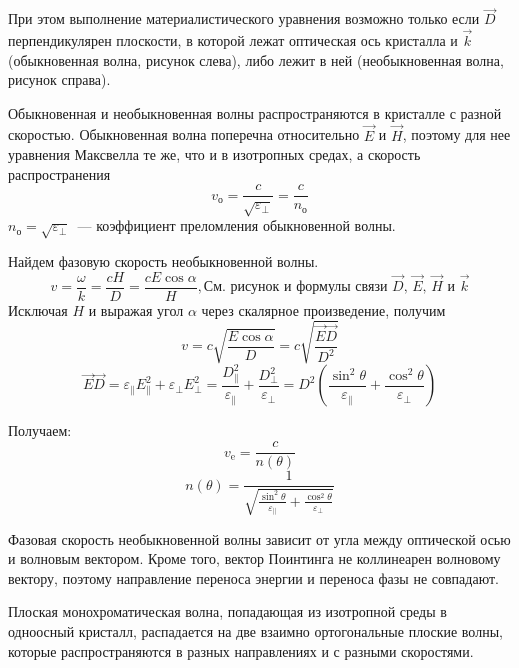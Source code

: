 При этом выполнение материалистического уравнения возможно только если $\vec{D}$ перпендикулярен плоскости, в которой лежат оптическая ось кристалла и $\vec{k}$ (обыкновенная волна, рисунок слева), либо лежит в ней (необыкновенная волна, рисунок справа).

\begin{figure}[ht!]
\end{figure}

Обыкновенная и необыкновенная волны распространяются в кристалле с разной скоростью. Обыкновенная волна поперечна относительно $\vec{E}$ и $\vec{H}$, поэтому для нее уравнения Максвелла те же, что и в изотропных средах, а скорость распространения
\[
    v_{\text{о}} = \frac{c}{\sqrt{ \varepsilon_{\perp}}} = \frac{c}{n_{\text{о}}}
\]
$n_{\text{о}} = \sqrt{ \varepsilon_{\perp}}$~--- коэффициент преломления обыкновенной волны.

Найдем фазовую скорость необыкновенной волны.
\[
    v = \frac{ \omega}{k} = \frac{cH}{D} = \frac{cE\cos \alpha}{H}, \text{См. рисунок и формулы связи $\vec{D}$, $\vec{E}$, $\vec{H}$ и $\vec{k}$}
\]
Исключая $H$ и выражая угол $ \alpha$ через скалярное произведение, получим
\[
    v = c\sqrt{\frac{E \cos \alpha}{D}} = c\sqrt{\frac{\vec{E} \vec{D}}{D^{2}}}
\]
\[
    \vec{E} \vec{D} = \varepsilon_{\parallel}E^{2}_{\parallel} + \varepsilon_{\perp}E^{2}_{\perp} = \frac{D_{\parallel}^{2}}{ \varepsilon_{\parallel}} + \frac{D_{\perp}^{2}}{ \varepsilon_{\perp}} = D^{2} \left(\frac{\sin^{2} \theta}{\varepsilon_{\parallel}} + \frac{\cos^{2} \theta}{ \varepsilon_{\perp}}\right)
\]

Получаем:
\[
    v_{\text{e}} = \frac{c}{n( \theta)}
\]
\[
n(\theta) = \frac{1}{\sqrt{\frac{\sin^{2} \theta}{ \varepsilon_{\parallel}} + \frac{\cos^{2} \theta}{ \varepsilon_{\perp}}}}
\]

Фазовая скорость необыкновенной волны зависит от угла между оптической осью и волновым вектором. Кроме того, вектор Поинтинга не коллинеарен волновому вектору, поэтому направление переноса энергии и переноса фазы не совпадают.

Плоская монохроматическая волна, попадающая из изотропной среды в одноосный кристалл, распадается на две взаимно ортогональные плоские волны, которые распространяются в разных направлениях и с разными скоростями.

